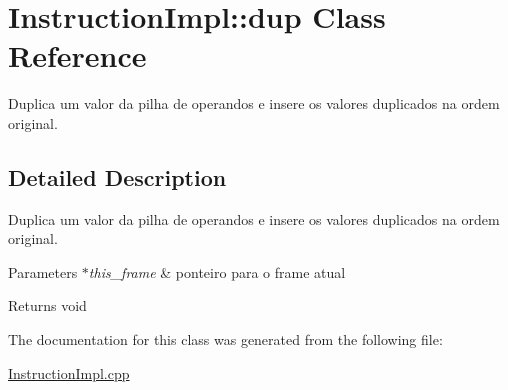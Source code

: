 \hypertarget{class_instruction_impl_1_1dup}{}\section{Instruction\+Impl\+:\+:dup Class Reference}
\label{class_instruction_impl_1_1dup}


Duplica um valor da pilha de operandos e insere os valores duplicados na ordem original.  




\subsection{Detailed Description}
Duplica um valor da pilha de operandos e insere os valores duplicados na ordem original. 


\begin{DoxyParams}{Parameters}
{\em $\ast$this\+\_\+frame} & ponteiro para o frame atual \\
\hline
\end{DoxyParams}
\begin{DoxyReturn}{Returns}
void 
\end{DoxyReturn}


The documentation for this class was generated from the following file\+:\begin{DoxyCompactItemize}
\item 
\hyperlink{_instruction_impl_8cpp}{Instruction\+Impl.\+cpp}\end{DoxyCompactItemize}
